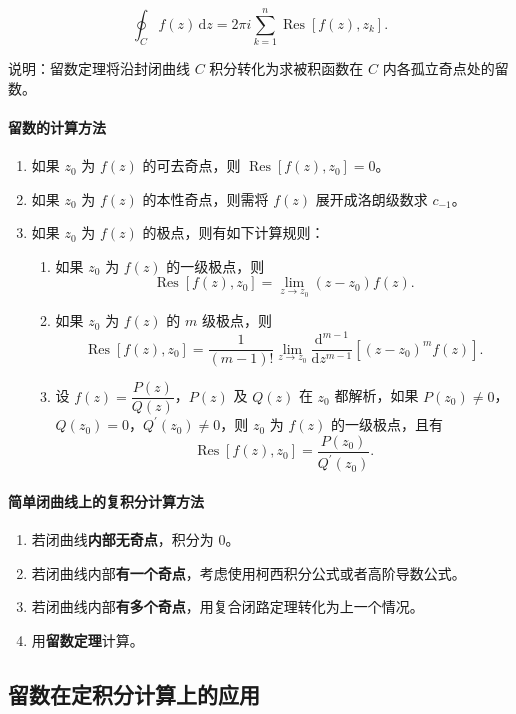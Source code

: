\[
\oint_{C} f(z) \,\mathrm{d}z=2\pi i \sum_{k=1}^{n} \operatorname{Res}\left[f(z), z_k\right].
\]

说明：留数定理将沿封闭曲线 \(C\) 积分转化为求被积函数在 \(C\)
内各孤立奇点处的留数。
\paragraph{留数的计算方法}
\label{留数的计算方法}
\begin{enumerate}
\item 如果 \(z_{0}\) 为 \(f(z)\) 的可去奇点，则
\(\operatorname{Res}\left[f(z),z_{0}\right]=0\)。
\item 如果 \(z_{0}\) 为 \(f(z)\) 的本性奇点，则需将 \(f(z)\)
展开成洛朗级数求 \(c_{-1}\)。
\item 如果 \(z_{0}\) 为 \(f(z)\) 的极点，则有如下计算规则：
\begin{enumerate}
\item 如果 \(z_{0}\) 为 \(f(z)\) 的一级极点，则
\[
      \operatorname{Res}\left[f(z),z_{0}\right]=\lim _{z\rightarrow z_{0}}\left(z-z_{0}\right) f(z).
      \]
\item 如果 \(z_{0}\) 为 \(f(z)\) 的 \(m\) 级极点，则
\[
      \operatorname{Res}\left[f(z),z_{0}\right]=\frac{1}{(m-1)!}\lim_{z\to z_{0}}\frac{\mathrm{d}^{m-1}}{\mathrm{d}z^{m-1}}\left[(z-z_{0})^{m}f(z)\right].
      \]
\item 设 \(f(z)=\dfrac{P(z)}{Q(z)}\)，\(P(z)\) 及 \(Q(z)\) 在 \(z_{0}\)
都解析，如果
\(P(z_{0})\neq 0\)，\(Q(z_{0})=0\)，\(Q^{\prime}(z_{0})\neq 0\)，则
\(z_{0}\) 为 \(f(z)\) 的一级极点，且有
\[
      \operatorname{Res}[f(z),z_{0}]=\dfrac{P(z_{0})}{Q^{\prime}(z_{0})}.
      \]
\end{enumerate}
\end{enumerate}
\paragraph{简单闭曲线上的复积分计算方法}
\label{简单闭曲线上的复积分计算方法}
\begin{enumerate}
\item 若闭曲线\textbf{内部无奇点}，积分为 \(0\)。
\item 若闭曲线内部\textbf{有一个奇点}，考虑使用柯西积分公式或者高阶导数公式。
\item 若闭曲线内部\textbf{有多个奇点}，用复合闭路定理转化为上一个情况。
\item 用\textbf{留数定理}计算。
\end{enumerate}
\subsection{留数在定积分计算上的应用}
\label{留数在定积分计算上的应用}
